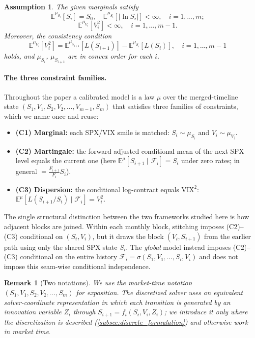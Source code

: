 \documentclass{article}
\newtheorem{assumption}[theorem]{Assumption}
\newtheorem{remark}[theorem]{Remark}
\newcommand{\cF}{\mathcal{F}}
\newcommand{\Embb}{\mathbb{E}}
\begin{document}
\begin{assumption}\label{ass:marginals}
The given marginals satisfy
\begin{equation}
    \Embb^{\mu_{S_i}}[S_i] = S_0, \quad \Embb^{\mu_{S_i}}[|\ln S_i|] < \infty, \quad i = 1, \ldots, m;
\end{equation}
\begin{equation}
    \Embb^{\mu_{V_i}}[V_i^2] < \infty, \quad i = 1, \ldots, m-1.
\end{equation}
Moreover, the consistency condition
\begin{equation}\label{eq:consistency_global}
    \Embb^{\mu_{V_i}}[V_i^2] = \Embb^{\mu_{S_{i+1}}}[L(S_{i+1})] - \Embb^{\mu_{S_i}}[L(S_i)], \quad i = 1, \ldots, m-1
\end{equation}
holds, and $\mu_{S_i}$, $\mu_{S_{i+1}}$ are in convex order for each $i$.
\end{assumption}

\paragraph{The three constraint families.} Throughout the paper a calibrated model is a law $\mu$ over the merged-timeline state $(S_1, V_1, S_2, V_2, \ldots, V_{m-1}, S_m)$ that satisfies three families of constraints, which we name once and reuse:
\begin{itemize}
    \item \textbf{(C1) Marginal:} each SPX/VIX smile is matched:
    $S_i \sim \mu_{S_i}$ and $V_i \sim \mu_{V_i}$.
    \item \textbf{(C2) Martingale:} the forward-adjusted conditional mean of the next SPX level equals the current one (here $\Embb^\mu[S_{i+1}\mid\cF_i]=S_i$ under zero rates; in general $=\tfrac{F_{i+1}}{F_i}S_i$).
    \item \textbf{(C3) Dispersion:} the conditional log-contract equals $\mathrm{VIX}^2$:
    $\Embb^\mu[L(S_{i+1}/S_i)\mid\cF_i]=V_i^2$.
\end{itemize}
The single structural distinction between the two frameworks studied here is how adjacent blocks are joined.
Within each monthly block, stitching imposes (C2)--(C3) conditional on $(S_i,V_i)$, but it draws the block $(V_i,S_{i+1})$ from the earlier path using only the shared SPX state $S_i$.
The \emph{global} model instead imposes (C2)--(C3) conditional on the entire history $\cF_i=\sigma(S_1,V_1,\ldots,S_i,V_i)$ and does not impose this seam-wise conditional independence.

\begin{remark}[Two notations]\label{rem:notation}
We use the \emph{market-time} notation $(S_1,V_1,S_2,V_2,\ldots,S_m)$ for exposition.
The discretized solver uses an equivalent \emph{solver-coordinate} representation in which each transition is generated by an innovation variable $Z_i$ through $S_{i+1} = f_i(S_i, V_i, Z_i)$; we introduce it only where the discretization is described (\cref{subsec:discrete_formulation}) and otherwise work in market time.
\end{remark}
\end{document}

